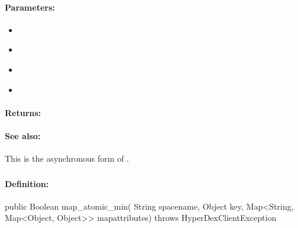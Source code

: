 \paragraph{Parameters:}
\begin{itemize}[noitemsep]
\item {}\\

\item {}\\

\item {}\\

\item {}\\

\end{itemize}

\paragraph{Returns:}


\paragraph{See also:}  This is the asynchronous form of .

\pagebreak
\subsubsection{}
\label{api:java:map_atomic_min}


\paragraph{Definition:}
\begin{javacode}
public Boolean map_atomic_min(
        String spacename,
        Object key,
        Map<String, Map<Object, Object>> mapattributes) throws HyperDexClientException
\end{javacode}

